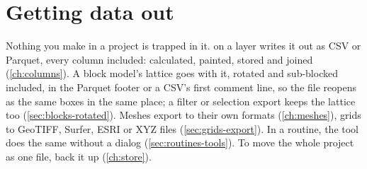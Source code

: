 \section{Getting data out}
Nothing you make in a project is trapped in it.  on a layer writes it out as CSV or Parquet, every column included: calculated, painted, stored and joined (\cref{ch:columns}). A block model's lattice goes with it, rotated and sub-blocked included, in the Parquet footer or a CSV's first comment line, so the file reopens as the same boxes in the same place; a filter or selection export keeps the lattice too (\cref{sec:blocks-rotated}). Meshes export to their own formats (\cref{ch:meshes}), grids to GeoTIFF, Surfer, ESRI or XYZ files (\cref{sec:grids-export}). In a routine, the  tool does the same without a dialog (\cref{sec:routines-tools}). To move the whole project as one file, back it up (\cref{ch:store}).
